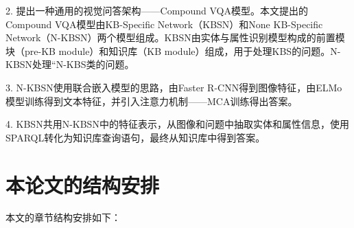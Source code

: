 2. 提出一种通用的视觉问答架构——Compound VQA模型。本文提出的Compound VQA模型由KB-Specific Network（KBSN）和None KB-Specific Network（N-KBSN）两个模型组成。KBSN由实体与属性识别模型构成的前置模块（pre-KB module）和知识库（KB module）组成，用于处理KBS的问题。N-KBSN处理“N-KBS类的问题。

3. N-KBSN使用联合嵌入模型的思路，由Faster R-CNN得到图像特征，由ELMo模型训练得到文本特征，并引入注意力机制——MCA训练得出答案。

4. KBSN共用N-KBSN中的特征表示，从图像和问题中抽取实体和属性信息，使用SPARQL转化为知识库查询语句，最终从知识库中得到答案。

\section{本论文的结构安排}
本文的章节结构安排如下：
